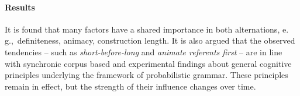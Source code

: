 \documentclass[a4paper,12pt]{article}
\newcommand{\eg}{e.\,g.,\ }
\begin{document}
\begin{mdframed}
  \paragraph{Results}

  It is found that many factors have a shared importance in both alternations, \eg definiteness, animacy, construction length.
  It is also argued that the observed tendencies -- such as \textit{short-before-long} and \textit{animate referents first} -- are in line with synchronic corpus based and experimental findings about general cognitive principles underlying the framework of probabilistic grammar.
  These principles remain in effect, but the strength of their influence changes over time.

\end{mdframed}

\vspace{2\baselineskip}
\end{document}
